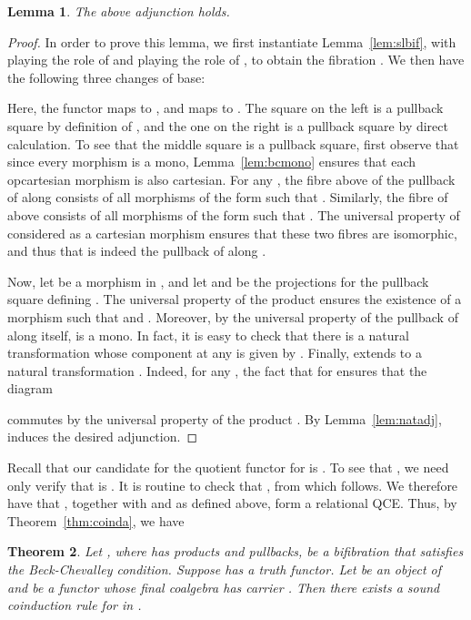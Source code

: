 \documentclass{LMCS}
\theoremstyle{plain}
\newtheorem{theorem}{Theorem}[section]
\newtheorem{lemma}[theorem]{Lemma}
\theoremstyle{remark}
\theoremstyle{definition}
\begin{document}
\begin{lemma}\label{lem:tausigma}
  The above adjunction  holds. 
\end{lemma}
\begin{proof}
  In order to prove this lemma, we first instantiate
  Lemma~\ref{lem:slbif}, with  playing the role of  and
   playing the role of , to obtain the fibration
  . We then have the following three
  changes of base:
  
  Here, the functor  maps  to
  , and  maps  to . The square on the left is a pullback square by
  definition of , and the one on the right is a pullback
  square by direct calculation. To see that the middle square is a
  pullback square, first observe that since every morphism
   is a mono, Lemma~\ref{lem:bcmono} ensures
  that each opcartesian morphism  is also
  cartesian.  For any , the fibre above  of the pullback
  of  along  consists of all
  morphisms of the form  such that . Similarly, the fibre of  above  consists of all
  morphisms of the form  such that . The
  universal property of  considered as a cartesian
  morphism ensures that these two fibres are isomorphic, and thus that
   is indeed the pullback of  along .

  Now, let  be a morphism in , and let  and  be
  the projections for the pullback square defining . The
  universal property of the product  ensures the existence
  of a morphism  such that 
  and .  Moreover, by the universal property of the
  pullback of  along itself,  is a mono. In fact, it is easy
  to check that there is a natural transformation  whose component at any  is given by
  .  Finally,  extends to a natural transformation . Indeed, for any
  , the fact that  for  ensures that the diagram
  
  commutes by the universal property of the product .  By
  Lemma~\ref{lem:natadj},  induces the desired adjunction.
\end{proof}

Recall that our candidate for the quotient functor  for
 is . To see that , we need
only verify that  is . It is routine to check
that , from which 
follows. We therefore have that , together with 
 and  as defined above, form a relational
QCE. Thus, by Theorem~\ref{thm:coinda}, we have 

\begin{theorem}\label{thm:icoinda}
  Let , where  has products and pullbacks, be a
  bifibration that satisfies the Beck-Chevalley condition. Suppose 
  has a truth functor. Let  be an object of  and  be a functor whose final coalgebra has carrier . Then
  there exists a sound coinduction rule for  in .
\end{theorem}
\end{document}
